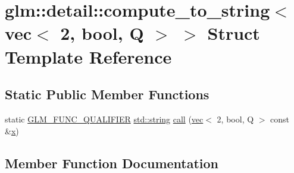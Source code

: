 \hypertarget{structglm_1_1detail_1_1compute__to__string_3_01vec_3_012_00_01bool_00_01_q_01_4_01_4}{}\section{glm\+:\+:detail\+:\+:compute\+\_\+to\+\_\+string$<$ vec$<$ 2, bool, Q $>$ $>$ Struct Template Reference}
\label{structglm_1_1detail_1_1compute__to__string_3_01vec_3_012_00_01bool_00_01_q_01_4_01_4}
\subsection*{Static Public Member Functions}
\begin{DoxyCompactItemize}
\item 
static \hyperlink{setup_8hpp_a33fdea6f91c5f834105f7415e2a64407}{G\+L\+M\+\_\+\+F\+U\+N\+C\+\_\+\+Q\+U\+A\+L\+I\+F\+I\+ER} \hyperlink{_s_d_l__opengl__glext_8h_ae84541b4f3d8e1ea24ec0f466a8c568b}{std\+::string} \hyperlink{structglm_1_1detail_1_1compute__to__string_3_01vec_3_012_00_01bool_00_01_q_01_4_01_4_a08b55aa0b86bc8176b9fa02f0520c434}{call} (\hyperlink{structglm_1_1vec}{vec}$<$ 2, bool, Q $>$ const \&\hyperlink{_s_d_l__opengl_8h_ad0e63d0edcdbd3d79554076bf309fd47}{x})
\end{DoxyCompactItemize}


\subsection{Member Function Documentation}
\mbox{\label{structglm_1_1detail_1_1compute__to__string_3_01vec_3_012_00_01bool_00_01_q_01_4_01_4_a08b55aa0b86bc8176b9fa02f0520c434}} 
